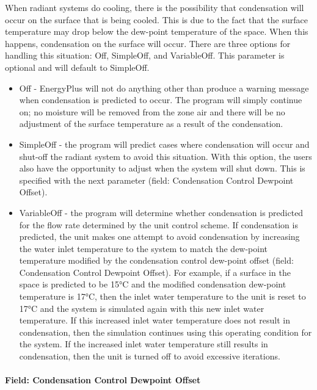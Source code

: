When radiant systems do cooling, there is the possibility that condensation will occur on the surface that is being cooled. This is due to the fact that the surface temperature may drop below the dew-point temperature of the space. When this happens, condensation on the surface will occur. There are three options for handling this situation: Off, SimpleOff, and VariableOff. This parameter is optional and will default to SimpleOff.

\begin{itemize}
\item
  Off - EnergyPlus will not do anything other than produce a warning message when condensation is predicted to occur. The program will simply continue on; no moisture will be removed from the zone air and there will be no adjustment of the surface temperature as a result of the condensation.
\item
  SimpleOff - the program will predict cases where condensation will occur and shut-off the radiant system to avoid this situation. With this option, the users also have the opportunity to adjust when the system will shut down. This is specified with the next parameter (field: Condensation Control Dewpoint Offset).
\item
  VariableOff - the program will determine whether condensation is predicted for the flow rate determined by the unit control scheme.  If condensation is predicted, the unit makes one attempt to avoid condensation by increasing the water inlet temperature to the system to match the dew-point temperature modified by the condensation control dew-point offset (field: Condensation Control Dewpoint Offset). For example, if a surface in the space is predicted to be 15°C and the modified condensation dew-point temperature is 17°C, then the inlet water temperature to the unit is reset to 17°C and the system is simulated again with this new inlet water temperature.  If this increased inlet water temperature does not result in condensation, then the simulation continues using this operating condition for the system.  If the increased inlet water temperature still results in condensation, then the unit is turned off to avoid excessive iterations.
\end{itemize}

\paragraph{Field: Condensation Control Dewpoint Offset}\label{field-condensation-control-dewpoint-offset-2}

